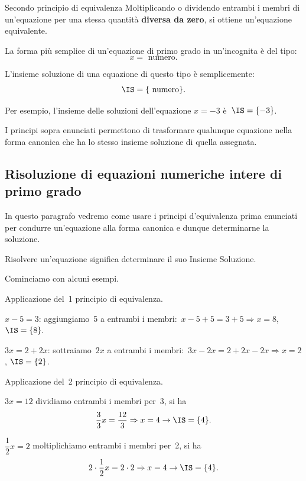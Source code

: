 \begin{teorema}{Secondo principio di equivalenza}{}
 Moltiplicando o dividendo entrambi i membri di un'equazione 
per una stessa quantità \textbf{diversa da zero}, 
si ottiene un'equazione equivalente.
\end{teorema}

La forma più semplice di un'equazione di primo grado in
un'incognita è del tipo:
\[x = \text{ numero}.\]

L'insieme soluzione di una
equazione di questo tipo è semplicemente:
\[\IS=\{\text{ numero} \}.\]

Per esempio, l'insieme delle soluzioni dell'equazione
\(x = -3\) è~\(\IS =\{-3\}\).

I principi sopra enunciati permettono di trasformare qualunque equazione
nella forma canonica che ha lo stesso insieme soluzione di quella
assegnata.

\subsection{Risoluzione di equazioni numeriche intere di primo grado}
In questo paragrafo vedremo come usare i principi
d'equivalenza prima enunciati per condurre
un'equazione alla forma canonica e dunque determinarne
la soluzione.

\begin{definizione}{}{}
Risolvere un'equazione significa
determinare il suo Insieme Soluzione.
\end{definizione}

Cominciamo con alcuni esempi.

 \begin{esempio}{}{}
Applicazione del~1{\textdegree} principio di equivalenza.

\begin{enumeratea}
\item \(x-5=3\):
aggiungiamo~5 a entrambi i membri:~\(x-5+5=3+5\Rightarrow x=8\), \(\IS 
=\{8\}.\)
\item \(3x=2+2x\): sottraiamo~\(2x\) a entrambi i 
membri:~\(3x-2x=2+2x-2x\Rightarrow 
x=2\),
\(\IS =\{2\}\).
\end{enumeratea}
 \end{esempio}


 \begin{esempio}{}{}
 Applicazione del~2{\textdegree} principio di equivalenza.

 \begin{enumeratea}
\item \(3x=12\) dividiamo entrambi i membri per~3, si ha
\[\dfrac{3}{3}x=\dfrac{12}{3}\Rightarrow x=4\to\IS =\{4\}.\]
\item \(\dfrac{1}{2}x=2\) moltiplichiamo entrambi i membri per~2, si ha
\[2\cdot {\dfrac{1}{2}}x=2\cdot 2\Rightarrow x=4\to\IS =\{4\}.\]
\end{enumeratea}
\end{esempio}

